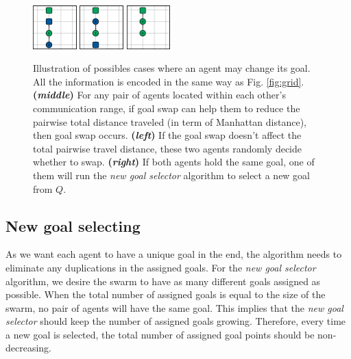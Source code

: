 \documentclass[journal]{IEEEtran}
\begin{document}
\begin{figure}[h]
\centering
\includegraphics[width=0.15\textwidth]{traffic2/00.jpg}
\hfill
\includegraphics[width=0.15\textwidth]{traffic2/01.jpg}
\hfill
\includegraphics[width=0.15\textwidth]{traffic2/02.jpg}
\caption{Illustration of possibles cases where an agent may change its goal. All the information is encoded in the same way as Fig. \ref{fig:grid}.  \textbf{(\textit{middle})} For any pair of agents located within each other's communication range, if goal swap can help them to reduce the pairwise total distance traveled (in term of Manhattan distance), then goal swap occurs.  \textbf{(\textit{left})} If the goal swap doesn't affect the total pairwise travel distance, these two agents randomly decide whether to swap. \textbf{(\textit{right})} If both agents hold the same goal, one of them will run the \textit{new goal selector} algorithm to select a new goal from $Q$. }
\label{fig:i3}
\end{figure}
\label{motion planning}




\subsection{New goal selecting}
As we want each agent to have a unique goal in the end, the algorithm needs to eliminate any duplications in the assigned goals. For the \textit{new goal selector} algorithm, we desire the swarm to have as many different goals assigned as possible.  When the total number of assigned goals is equal to the size of the swarm, no pair of agents will have the same goal. This implies that the \textit{new goal selector} should keep the number of assigned goals growing.  Therefore, every time a new goal is selected, the total number of assigned goal points should be non-decreasing. 
\end{document}
